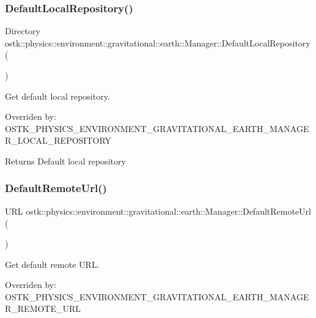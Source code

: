 \subsubsection{\texorpdfstring{Default\+Local\+Repository()}{DefaultLocalRepository()}}
{\footnotesize\ttfamily Directory ostk\+::physics\+::environment\+::gravitational\+::earth\+::\+Manager\+::\+Default\+Local\+Repository (\begin{DoxyParamCaption}{ }\end{DoxyParamCaption})\hspace{0.3cm}{\ttfamily [static]}}



Get default local repository. 

Overriden by\+: O\+S\+T\+K\+\_\+\+P\+H\+Y\+S\+I\+C\+S\+\_\+\+E\+N\+V\+I\+R\+O\+N\+M\+E\+N\+T\+\_\+\+G\+R\+A\+V\+I\+T\+A\+T\+I\+O\+N\+A\+L\+\_\+\+E\+A\+R\+T\+H\+\_\+\+M\+A\+N\+A\+G\+E\+R\+\_\+\+L\+O\+C\+A\+L\+\_\+\+R\+E\+P\+O\+S\+I\+T\+O\+RY

\begin{DoxyReturn}{Returns}
Default local repository 
\end{DoxyReturn}
\mbox{\label{classostk_1_1physics_1_1environment_1_1gravitational_1_1earth_1_1_manager_aa5a7e062dba707faaf9da092e011f23d}} 
\subsubsection{\texorpdfstring{Default\+Remote\+Url()}{DefaultRemoteUrl()}}
{\footnotesize\ttfamily U\+RL ostk\+::physics\+::environment\+::gravitational\+::earth\+::\+Manager\+::\+Default\+Remote\+Url (\begin{DoxyParamCaption}{ }\end{DoxyParamCaption})\hspace{0.3cm}{\ttfamily [static]}}



Get default remote U\+RL. 

Overriden by\+: O\+S\+T\+K\+\_\+\+P\+H\+Y\+S\+I\+C\+S\+\_\+\+E\+N\+V\+I\+R\+O\+N\+M\+E\+N\+T\+\_\+\+G\+R\+A\+V\+I\+T\+A\+T\+I\+O\+N\+A\+L\+\_\+\+E\+A\+R\+T\+H\+\_\+\+M\+A\+N\+A\+G\+E\+R\+\_\+\+R\+E\+M\+O\+T\+E\+\_\+\+U\+RL


